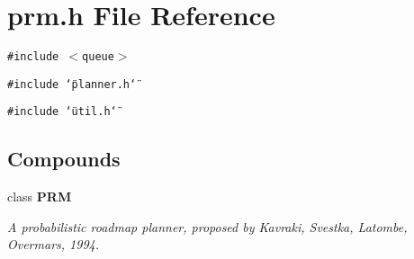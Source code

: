 \section{prm.h File Reference}
\label{prm_h}
{\tt \#include $<$queue$>$}\par
{\tt \#include \char`\"{}planner.h\char`\"{}}\par
{\tt \#include \char`\"{}util.h\char`\"{}}\par
\subsection*{Compounds}
\begin{CompactItemize}
\item 
class {\bf PRM}
\begin{CompactList}\small\item\em A probabilistic roadmap planner, proposed by Kavraki, Svestka, Latombe, Overmars, 1994.\item\end{CompactList}\end{CompactItemize}
